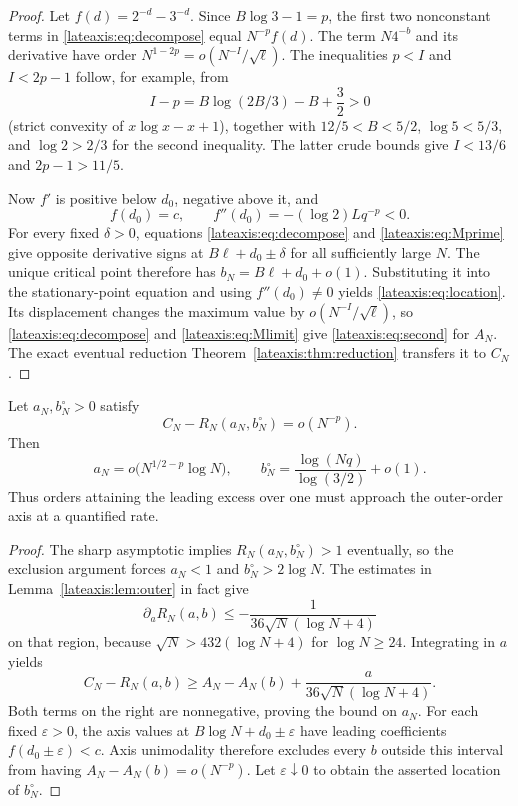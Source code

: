 \begin{proof}
Let $f(d)=2^{-d}-3^{-d}$.  Since $B\log3-1=p$, the first two
nonconstant terms in \eqref{lateaxis:eq:decompose} equal
$N^{-p}f(d)$.  The term $N4^{-b}$ and its derivative have order
$N^{1-2p}=o(N^{-I}/\sqrt\ell)$.  The inequalities $p<I$ and
$I<2p-1$ follow, for example, from
\[
 I-p=B\log(2B/3)-B+\frac32>0
\]
(strict convexity of $x\log x-x+1$), together with
$12/5<B<5/2$, $\log5<5/3$, and $\log2>2/3$ for the second
inequality.  The latter crude bounds give $I<13/6$ and
$2p-1>11/5$.

Now $f'$ is positive below $d_0$, negative above it, and
\[
 f(d_0)=c,\qquad f''(d_0)=-(\log2)Lq^{-p}<0.
\]
For every fixed $\delta>0$, equations
\eqref{lateaxis:eq:decompose} and \eqref{lateaxis:eq:Mprime}
give opposite derivative signs at $B\ell+d_0\pm\delta$ for all
sufficiently large $N$.  The unique critical point therefore has
$b_N=B\ell+d_0+o(1)$.  Substituting it into the stationary-point
equation and using $f''(d_0)\ne0$ yields
\eqref{lateaxis:eq:location}.  Its displacement changes the maximum
value by $o(N^{-I}/\sqrt\ell)$, so
\eqref{lateaxis:eq:decompose} and \eqref{lateaxis:eq:Mlimit} give
\eqref{lateaxis:eq:second} for $A_N$.  The exact eventual reduction
Theorem~\ref{lateaxis:thm:reduction} transfers it to $C_N$.
\end{proof}

\begin{corollary}
\label{lateaxis:cor:concentration}
Let $a_N,b_N^{\circ}>0$ satisfy
\[
 C_N-R_N(a_N,b_N^{\circ})=o(N^{-p}).
\]
Then
\[
 a_N=o\bigl(N^{1/2-p}\log N\bigr),\qquad
 b_N^{\circ}=\frac{\log(Nq)}{\log(3/2)}+o(1).
\]
Thus orders attaining the leading excess over one must approach the
outer-order axis at a quantified rate.
\end{corollary}
\begin{proof}
The sharp asymptotic implies $R_N(a_N,b_N^{\circ})>1$ eventually,
so the exclusion argument forces $a_N<1$ and $b_N^{\circ}>2\log N$.
The estimates in Lemma~\ref{lateaxis:lem:outer} in fact give
\[
 \partial_aR_N(a,b)\le-\frac1{36\sqrt N(\log N+4)}
\]
on that region, because $\sqrt N>432(\log N+4)$ for $\log N\ge24$.
Integrating in $a$ yields
\[
 C_N-R_N(a,b)\ge A_N-A_N(b)
                     +\frac a{36\sqrt N(\log N+4)}.
\]
Both terms on the right are nonnegative, proving the bound on $a_N$.
For each fixed $\varepsilon>0$, the axis values at
$B\log N+d_0\pm\varepsilon$ have leading coefficients
$f(d_0\pm\varepsilon)<c$.  Axis unimodality therefore excludes
every $b$ outside this interval from having
$A_N-A_N(b)=o(N^{-p})$.  Let $\varepsilon\downarrow0$ to obtain
the asserted location of $b_N^{\circ}$.
\end{proof}

